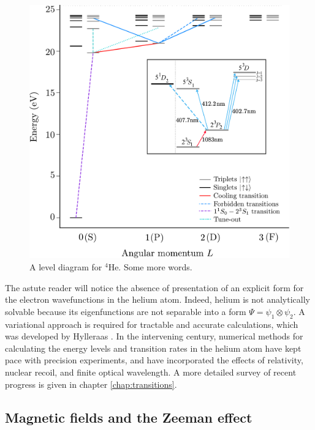 	\begin{figure}
		\includegraphics[width=\textwidth]{fig/introduction/full_lvl_diag}
		\caption{A level diagram for $^4$He. Some more words.}
		\label{fig:full_level_diagram}
	\end{figure}

	The astute reader will notice the absence of presentation of an explicit form for the electron wavefunctions in the helium atom.
	Indeed,	helium is not analytically solvable because its eigenfunctions are not separable into a form $\Psi = \psi_1\otimes\psi_2$.
	A variational approach is required for tractable and accurate calculations, which was developed by Hylleraas \cite{Hylleraas1920,Hylleraas1929,Hylleraas1930}.
	In the intervening century, numerical methods for calculating the energy levels and transition rates in the helium atom have kept pace with precision experiments, and have incorporated the effects of relativity, nuclear recoil, and finite optical wavelength. A more detailed survey of recent progress is given in chapter \ref{chap:transitions}.

	

	

	\subsection*{Magnetic fields and the Zeeman effect}

